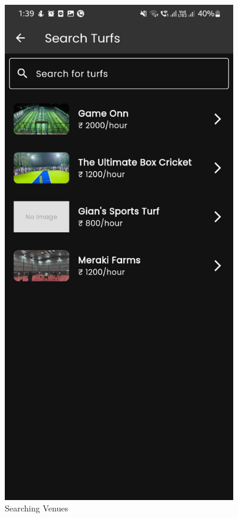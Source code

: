 \documentclass[12pt,a4paper]{report}
\begin{document}
\begin{figure}[H]
    \hfill
    \begin{minipage}[t]{0.3\textwidth}
        \centering
        \includegraphics[width=0.9\textwidth]{assets/screenshot6.jpeg}
        \caption{Searching Venues}
    \end{minipage}
\end{figure}
\end{document}
